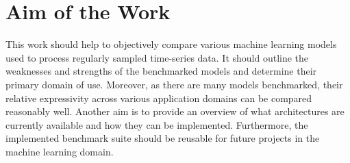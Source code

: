 \documentclass[draft,final]{vutinfth} %
\begin{document}
    \section{Aim of the Work}
    This work should help to objectively compare various machine learning models used to process regularly sampled time-series data.
    It should outline the weaknesses and strengths of the benchmarked models and determine their primary domain of use.
    Moreover, as there are many models benchmarked, their relative expressivity across various application domains can be compared reasonably well.
    Another aim is to provide an overview of what architectures are currently available and how they can be implemented.
    Furthermore, the implemented benchmark suite should be reusable for future projects in the machine learning domain.
\end{document}
